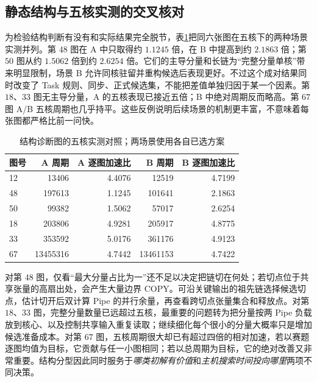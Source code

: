 \subsection{静态结构与五核实测的交叉核对}
为检验结构判断有没有和实际结果完全脱节，表\ref{tab:six-outcomes}把同六张图在五核下的两种场景实测并列。第 $48$ 图在 A 中只取得约 $1.1245$ 倍，在 B 中提高到约 $2.1863$ 倍；第 $50$ 图从约 $1.5062$ 倍到约 $2.6254$ 倍。它们的主导分量和长链为“完整分量单核”带来明显限制，场景 B 允许同核驻留并重构候选后表现更好。不过这个成对结果同时改变了 Task 规则、同步、正式候选集，不能把差值单独归因于某一个因素。第 $18$、$33$ 图无主导分量，A 的五核表现已接近五倍；B 中绝对周期反而略高。第 $67$ 图 A/B 五核周期也几乎持平。这些反例说明后续场景的机制更丰富，不意味着每张图都严格比前一问快。
\begin{table}[!htbp]\centering\small
\caption{结构诊断图的五核实测对照；两场景使用各自已选方案}\label{tab:six-outcomes}
\begin{tabular}{lrrrr}
\toprule
图号 & A 周期 & A 逐图加速比 & B 周期 & B 逐图加速比\\
\midrule
12 & 13406 & 4.4076 & 12519 & 4.7199\\
48 & 197613 & 1.1245 & 101641 & 2.1863\\
50 & 99382 & 1.5062 & 57017 & 2.6254\\
18 & 203806 & 4.9281 & 205917 & 4.8775\\
33 & 353592 & 5.0176 & 361176 & 4.9123\\
67 & 13455316 & 4.7442 & 13461153 & 4.7422\\
\bottomrule
\end{tabular}
\end{table}

对第 $48$ 图，仅看“最大分量占比为一”还不足以决定把链切在何处；若切点位于共享张量的高扇出处，会产生大量边界 COPY。可沿关键输出的祖先链选择候选切点，估计切开后双计算 Pipe 的并行余量，再查看跨切点张量集合和释放点。对第 $18$、$33$ 图，完整分量数量已远超过五核，最重要的问题转为把分量按两 Pipe 负载放到核心、以及控制共享输入重复读取；继续细化每个很小的分量大概率只是增加候选准备成本。对第 $67$ 图，五核周期很大却已有超过四倍的相对加速，若以赛题逐图均值为目标，它贡献与任一小图相同；若以总周期为目标，它的绝对改善又非常重要。结构分型因此同时服务于\emph{哪类初解有价值}和\emph{主机搜索时间投向哪里}两项不同决策。

